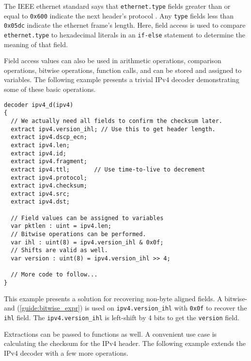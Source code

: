 The IEEE ethernet standard says that \texttt{ethernet.type} fields greater than or equal
to \texttt{0x600} indicate the next header's protocol \cite{eth_std}. Any \texttt{type}
fields less than \texttt{0x05dc} indicate the ethernet frame's length. Here, field access is used to compare \texttt{ethernet.type} to hexadecimal literals in an
\texttt{if-else} statement to determine the meaning of that field.

Field access values can also be used in arithmetic operations, comparison operations, bitwise operations, function calls,
and can be stored and assigned to variables. The following example presents
a trivial IPv4 decoder demonstrating some of these basic operations.

\begin{codepage}
\begin{lstlisting}
decoder ipv4_d(ipv4)
{
  // We actually need all fields to confirm the checksum later.
  extract ipv4.version_ihl; // Use this to get header length.
  extract ipv4.dscp_ecn;
  extract ipv4.len;
  extract ipv4.id;
  extract ipv4.fragment;
  extract ipv4.ttl;       // Use time-to-live to decrement
  extract ipv4.protocol;
  extract ipv4.checksum;
  extract ipv4.src;
  extract ipv4.dst;

  // Field values can be assigned to variables
  var pktlen : uint = ipv4.len;
  // Bitwise operations can be performed.
  var ihl : uint(8) = ipv4.version_ihl & 0x0f;
  // Shifts are valid as well.
  var version : uint(8) = ipv4.version_ihl >> 4;
  
  // More code to follow...
}
\end{lstlisting}
\end{codepage}

This example presents a solution for recovering non-byte aligned
fields. A bitwise-and (\ref{guide:bitwise_expr}) is used on \texttt{ipv4.version\_ihl}
with \texttt{0x0f} to recover the \texttt{ihl} field. The 
\texttt{ipv4.version\_ihl} is left-shift by 4 bits to get the \texttt{version} field.

Extractions can be passed to functions as well. A convenient use case is calculating the checksum for the IPv4 header. The following example extends the IPv4 decoder with a few more operations.


